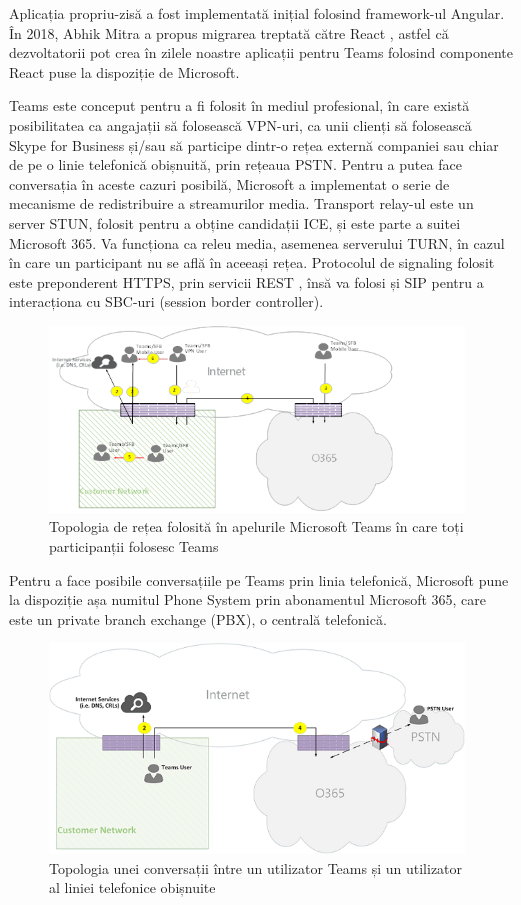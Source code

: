 \indent \par Aplicația propriu-zisă a fost implementată inițial folosind framework-ul Angular. În 2018, Abhik Mitra a propus migrarea treptată către React \cite{TeamsReact2018}, astfel că dezvoltatorii pot crea în zilele noastre aplicații pentru Teams folosind componente React puse la dispoziție de Microsoft.
\indent \par Teams este conceput pentru a fi folosit în mediul profesional, în care există posibilitatea ca angajații să folosească VPN-uri, ca unii clienți să folosească Skype for Business și/sau să participe dintr-o rețea externă companiei sau chiar de pe o linie telefonică obișnuită, prin rețeaua PSTN. Pentru a putea face conversația în aceste cazuri posibilă, Microsoft a implementat o serie de mecanisme de redistribuire a streamurilor media. Transport relay-ul este un server STUN, folosit pentru a obține candidații ICE, și este parte a suitei Microsoft 365. Va funcționa ca releu media, asemenea serverului TURN, în cazul în care un participant nu se află în aceeași rețea. Protocolul de signaling folosit este preponderent HTTPS, prin servicii REST \cite{TeamsFlows2018}, însă va folosi și SIP pentru a interacționa cu SBC-uri (session border controller).
\begin{figure}[!htbp]
    \centering
    \includegraphics[width=11cm]{figures/ms_teams_topology.png}
    \caption{Topologia de rețea folosită în apelurile Microsoft Teams în care toți participanții folosesc Teams}
\end{figure}
\indent \par Pentru a face posibile conversațiile pe Teams prin linia telefonică, Microsoft pune la dispoziție așa numitul Phone System prin abonamentul Microsoft 365, care este un private branch exchange (PBX), o centrală telefonică.
\begin{figure}[!htbp]
    \centering
    \includegraphics[width=11cm]{figures/ms_teams_to_pstn.png}
    \caption{Topologia unei conversații între un utilizator Teams și un utilizator al liniei telefonice obișnuite}
\end{figure}

